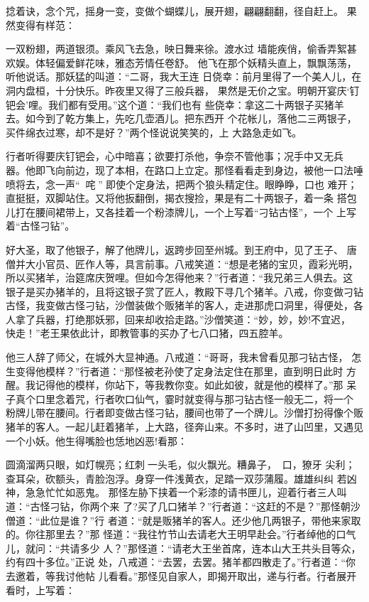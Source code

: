 捻着诀，念个咒，摇身一变，变做个蝴蝶儿，展开翅，翩翩翻翻，径自赶上。
果然变得有样范：

一双粉翅，两道银须。乘风飞去急，映日舞来徐。渡水过
墙能疾俏，偷香弄絮甚欢娱。体轻偏爱鲜花味，雅态芳情任卷舒。
他飞在那个妖精头直上，飘飘荡荡，听他说话。那妖猛的叫道：“二哥，我大王连
日侥幸：前月里得了一个美人儿，在洞内盘桓，十分快乐。昨夜里又得了三般兵器，
果然是无价之宝。明朝开宴庆‘钉钯会’哩。我们都有受用。”这个道：“我们也有
些侥幸：拿这二十两银子买猪羊去。如今到了乾方集上，先吃几壶酒儿。把东西开
个花帐儿，落他二三两银子，买件绵衣过寒，却不是好？”两个怪说说笑笑的，上
大路急走如飞。

行者听得要庆钉钯会，心中暗喜；欲要打杀他，争奈不管他事；况手中又无兵
器。他即飞向前边，现了本相，在路口上立定。那怪看看走到身边，被他一口法唾
喷将去，念一声“咤”，即使个定身法，把两个狼头精定住。眼睁睁，口也
难开；直挺挺，双脚站住。又将他扳翻倒，揭衣搜捡，果是有二十两银子，着一条
搭包儿打在腰间裙带上，又各挂着一个粉漆牌儿，一个上写着“刁钻古怪”，一个
上写着“古怪刁钻”。

好大圣，取了他银子，解了他牌儿，返跨步回至州城。到王府中，见了王子、
唐僧并大小官员、匠作人等，具言前事。八戒笑道：“想是老猪的宝贝，霞彩光明，
所以买猪羊，治筵席庆贺哩。但如今怎得他来？”行者道：“我兄弟三人俱去。这
银子是买办猪羊的，且将这银子赏了匠人，教殿下寻几个猪羊。八戒，你变做刁钻
古怪，我变做古怪刁钻，沙僧装做个贩猪羊的客人，走进那虎口洞里，得便处，各
人拿了兵器，打绝那妖邪，回来却收拾走路。”沙僧笑道：“妙，妙，妙!不宜迟，
快走！”老王果依此计，即教管事的买办了七八口猪，四五腔羊。

他三人辞了师父，在城外大显神通。八戒道：“哥哥，我未曾看见那刁钻古怪，
怎生变得他模样？”行者道：“那怪被老孙使了定身法定住在那里，直到明日此时
方醒。我记得他的模样，你站下，等我教你变。如此如彼，就是他的模样了。”那
呆子真个口里念着咒，行者吹口仙气，霎时就变得与那刁钻古怪一般无二，将一个
粉牌儿带在腰间。行者即变做古怪刁钻，腰间也带了一个牌儿。沙僧打扮得像个贩
猪羊的客人。一起儿赶着猪羊，上大路，径奔山来。不多时，进了山凹里，又遇见
一个小妖。他生得嘴脸也恁地凶恶!看那：

圆滴溜两只眼，如灯幌亮；红刺一头毛，似火飘光。糟鼻子，口，獠牙
尖利；查耳朵，砍额头，青脸泡浮。身穿一件浅黄衣，足踏一双莎蒲履。雄雄纠纠
若凶神，急急忙忙如恶鬼。
那怪左胁下挟着一个彩漆的请书匣儿，迎着行者三人叫道：“古怪刁钻，你两个来
了?买了几口猪羊？”行者道：“这赶的不是？”那怪朝沙僧道：“此位是谁？”行
者道：“就是贩猪羊的客人。还少他几两银子，带他来家取的。你往那里去？”那
怪道：“我往竹节山去请老大王明早赴会。”行者绰他的口气儿，就问：“共请多少
人？”那怪道：“请老大王坐首席，连本山大王共头目等众，约有四十多位。”正说
处，八戒道：“去罢，去罢。猪羊都四散走了。”行者道：“你去邀着，等我讨他帖
儿看看。”那怪见自家人，即揭开取出，递与行者。行者展开看时，上写着：


